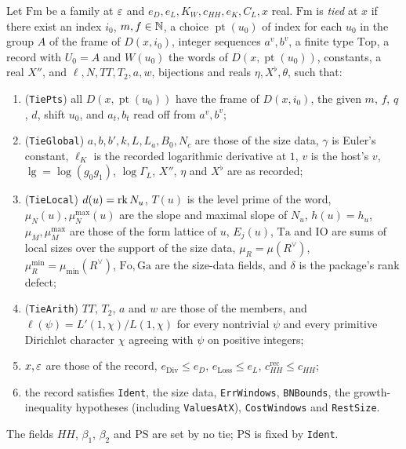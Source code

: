 \begin{definition}\label{geoa:tied}
Let $\mathrm{Fm}$ be a family at $\varepsilon$ and $e_D,e_L,K_W,c_{HH},e_K,C_L,x$ real.
$\mathrm{Fm}$ is \emph{tied} at $x$ if there exist an index $i_0$, $m,f\in\mathbb{N}$, a choice
$\operatorname{pt}(u_0)$ of index for each $u_0$ in the group $A$ of the frame of
$D(x,i_0)$, integer sequences $a^v,b^v$, a finite type $\mathrm{Top}$, a record with
$U_0=A$ and $W(u_0)$ the words of $D(x,\operatorname{pt}(u_0))$, constants, a real $X''$,
and $\ell,N,TT,T_2,a,w$, bijections and reals $\eta,X^{\flat},\theta$, such that:
\begin{enumerate}
\item (\texttt{TiePts}) all $D(x,\operatorname{pt}(u_0))$ have the frame of $D(x,i_0)$,
the given $m$, $f$, $q$, $d$, shift $u_0$, and $a_t,b_t$ read off from $a^v,b^v$;
\item (\texttt{TieGlobal}) $a,b,b',k,L,L_a,B_0,N_c$ are those of the size data, $\gamma$ is
Euler's constant, $\ell_K$ is the recorded logarithmic derivative at $1$, $v$ is the
host's $v$, $\lg=\log(g_0g_1)$, $\log\Gamma_L$, $X''$, $\eta$ and $X^{\flat}$ are as
recorded;
\item (\texttt{TieLocal}) $d(u)=\operatorname{rk} N_u$, $T(u)$ is the level prime of the word,
$\mu_N(u),\mu_N^{\max}(u)$ are the slope and maximal slope of $N_u$, $h(u)=h_u$,
$\mu_M,\mu_M^{\max}$ are those of the form lattice of $u$, $E_j(u)$, $\mathrm{Ta}$ and
$\mathrm{IO}$ are sums of local sizes over the support of the size data,
$\mu_R=\mu(R^{\vee})$, $\mu_R^{\min}=\mu_{\min}(R^{\vee})$, $\mathrm{Fo},\mathrm{Ga}$ are the
size-data fields, and $\delta$ is the package's rank defect;
\item (\texttt{TieArith}) $TT$, $T_2$, $a$ and $w$ are those of the members, and
$\ell(\psi)=L'(1,\chi)/L(1,\chi)$ for every nontrivial $\psi$ and every primitive
Dirichlet character $\chi$ agreeing with $\psi$ on positive integers;
\item $x,\varepsilon$ are those of the record, $e_{\mathrm{Div}}\le e_D$, $e_{\mathrm{Loss}}\le e_L$,
$c_{HH}^{\mathrm{rec}}\le c_{HH}$;
\item the record satisfies \texttt{Ident}, the size data, \texttt{ErrWindows},
\texttt{BNBounds}, the growth-inequality hypotheses (including \texttt{ValuesAtX}),
\texttt{CostWindows} and \texttt{RestSize}.
\end{enumerate}
The fields $HH$, $\beta_1$, $\beta_2$ and $\mathrm{PS}$ are set by no tie;
$\mathrm{PS}$ is fixed by \texttt{Ident}.
\end{definition}

